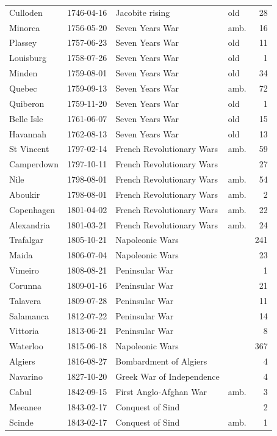 \documentclass[11pt,a4paper]{article}
\begin{document}
\begin{small}
\begin{longtable}{llp{5.2cm}lr}
Culloden & 1746-04-16 & Jacobite rising & old & 28\\
Minorca & 1756-05-20 & Seven Years War & amb. & 16\\
Plassey & 1757-06-23 & Seven Years War & old & 11\\
Louisburg & 1758-07-26 & Seven Years War & old & 1\\
Minden & 1759-08-01 & Seven Years War & old & 34\\
Quebec & 1759-09-13 & Seven Years War & amb. & 72\\
Quiberon & 1759-11-20 & Seven Years War & old & 1\\
Belle Isle & 1761-06-07 & Seven Years War & old & 15\\
Havannah & 1762-08-13 & Seven Years War & old & 13\\
St Vincent & 1797-02-14 & French Revolutionary Wars & amb. & 59\\
Camperdown & 1797-10-11 & French Revolutionary Wars &  & 27\\
Nile & 1798-08-01 & French Revolutionary Wars & amb. & 54\\
Aboukir & 1798-08-01 & French Revolutionary Wars & amb. & 2\\
Copenhagen & 1801-04-02 & French Revolutionary Wars & amb. & 22\\
Alexandria & 1801-03-21 & French Revolutionary Wars & amb. & 24\\
Trafalgar & 1805-10-21 & Napoleonic Wars &  & 241\\
Maida & 1806-07-04 & Napoleonic Wars &  & 23\\
Vimeiro & 1808-08-21 & Peninsular War &  & 1\\
Corunna & 1809-01-16 & Peninsular War &  & 21\\
Talavera & 1809-07-28 & Peninsular War &  & 11\\
Salamanca & 1812-07-22 & Peninsular War &  & 14\\
Vittoria & 1813-06-21 & Peninsular War &  & 8\\
Waterloo & 1815-06-18 & Napoleonic Wars &  & 367\\
Algiers & 1816-08-27 & Bombardment of Algiers &  & 4\\
Navarino & 1827-10-20 & Greek War of Independence &  & 4\\
Cabul & 1842-09-15 & First Anglo-Afghan War & amb. & 3\\
Meeanee & 1843-02-17 & Conquest of Sind &  & 2\\
Scinde & 1843-02-17 & Conquest of Sind & amb. & 1\\

\end{longtable}
\end{small}
\end{document}
